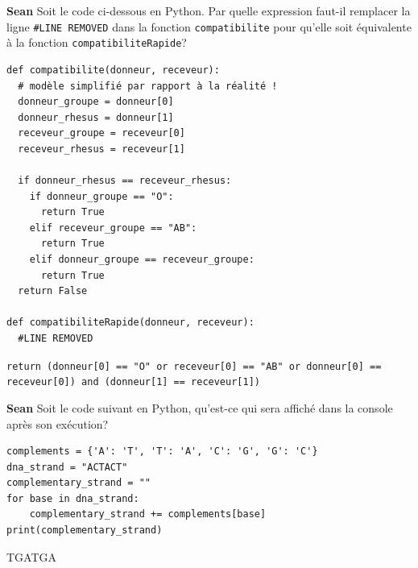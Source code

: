 \begin{Exercice}[5 minutes]\textbf{Sean}
Soit le code ci-dessous en Python. Par quelle expression faut-il remplacer la ligne \texttt{\#LINE REMOVED} dans la fonction \texttt{compatibilite} pour qu’elle soit équivalente à la fonction \texttt{compatibiliteRapide}?
\begin{lstlisting}[style=pythonstyle]
def compatibilite(donneur, receveur):
  # modèle simplifié par rapport à la réalité !
  donneur_groupe = donneur[0]
  donneur_rhesus = donneur[1]
  receveur_groupe = receveur[0]
  receveur_rhesus = receveur[1]

  if donneur_rhesus == receveur_rhesus:
    if donneur_groupe == "O":
      return True
    elif receveur_groupe == "AB":
      return True
    elif donneur_groupe == receveur_groupe:
      return True
  return False 

def compatibiliteRapide(donneur, receveur):
  #LINE REMOVED
\end{lstlisting}


\begin{solution}
\texttt{return (donneur[0] == "O" or receveur[0] == "AB" or donneur[0] == receveur[0]) and (donneur[1] == receveur[1])}
\end{solution}

\end{Exercice}

\begin{Exercice}[5 minutes]\textbf{Sean}
Soit le code suivant en Python, qu’est-ce qui sera affiché dans la console après son exécution?

\begin{lstlisting}[style=pythonstyle]
complements = {'A': 'T', 'T': 'A', 'C': 'G', 'G': 'C'}
dna_strand = "ACTACT"
complementary_strand = ""
for base in dna_strand:
    complementary_strand += complements[base]
print(complementary_strand)
\end{lstlisting}

\begin{solution}
TGATGA
\end{solution}
\end{Exercice}


